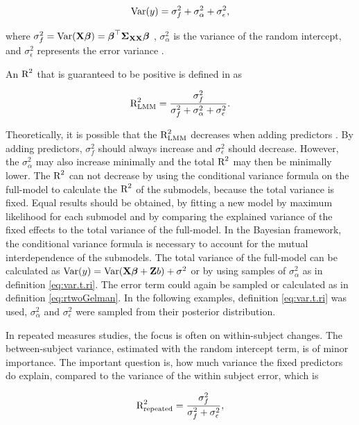 \documentclass[11pt,a4paper,twoside]{book}
\begin{document}
      \begin{align} 
        \operatorname{Var}(y) = \sigma_{f}^2  + \sigma_{\alpha}^2 + \sigma_{\epsilon}^2, \label{eq:var.t.ri} 
        \end{align}

where $\sigma_{f}^2 = \operatorname{Var}({\mathbf{X}} {\boldsymbol{\beta}}) = {\boldsymbol{\beta}}^\top {\boldsymbol{\Sigma}}{}_{{\mathbf{X}} {\mathbf{X}}}  {\boldsymbol{\beta}}$ , $\sigma_{\alpha}^2 $ is the variance of the random intercept, and $\sigma_{\epsilon}^2$ represents the error variance \citep{Nakagawa2013}. 

An $\text{R}^2$ that is guaranteed to be positive is defined in \cite{Nakagawa2013} as

   \begin{align} 
\text{R}^2_{\text{LMM}} = \frac{\sigma_{f}^2}{\sigma_{f}^2 + \sigma_{\alpha}^2 + \sigma_{\epsilon}^2}.
\end{align}


Theoretically, it is possible that the $\text{R}^2_{\text{LMM}}$ decreases when adding predictors \citep{Nakagawa2013}.  By adding predictors, $\sigma_{f}^2$  should always increase and  $\sigma_{\epsilon}^2$  should decrease. However, the $\sigma_{\alpha}^2$ may also increase minimally and the total $\text{R}^2$ may then be minimally lower. The $\text{R}^2$ can not decrease by using the conditional variance formula on the full-model to calculate the $\text{R}^2$ of the submodels, because the total variance is fixed. Equal results should be obtained, by fitting a new model by maximum likelihood for each submodel and by comparing the explained variance of the fixed effects to the total variance of the full-model.  In the Bayesian framework, the conditional variance formula is necessary to account for the mutual interdependence of the submodels. The total variance of the full-model can be calculated as  $\operatorname{Var}(y) = \operatorname{Var}({\mathbf{X}} {\boldsymbol{\beta}} + {\mathbf{Z}} b) + \sigma^2$ or by using samples of $\sigma_{\alpha}^2$ as in definition \eqref{eq:var.t.ri}. The error term could again be sampled or calculated as in definition \eqref{eq:rtwoGelman}. In the following examples, definition \eqref{eq:var.t.ri} was used,  $\sigma_{\alpha}^2$ and $\sigma_{\epsilon}^2$ were sampled from their posterior distribution.

In repeated measures studies, the focus is often on within-subject changes. The between-subject variance, estimated with the random intercept term, is of minor importance. The important question is, how much variance the fixed predictors do explain, compared to the variance of the within subject error, which is

   \begin{align} 
\text{R}^2_{\text{repeated}} = \frac{\sigma_{f}^2}{\sigma_{f}^2  + \sigma_{\epsilon}^2}, \label{eq:rtwo.repeated}
\end{align}
\end{document}
